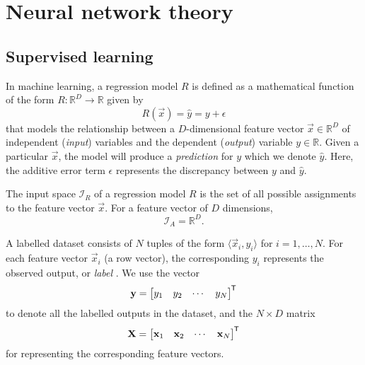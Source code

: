 \chapter{Neural network theory}
\section{Supervised learning}

\begin{definition}
    \label{def:reg_model}
    In machine learning, a regression model $R$ is defined as a mathematical function of the form $R:\mathbb{R}^D\rightarrow \mathbb{R}$ given by
    \begin{equation}
        \label{eq:reg_model}
        R(\vec{x}) = \hat{y} = y + \epsilon
    \end{equation}
    that models the relationship between a $D$-dimensional feature vector $\vec{x} \in \mathbb{R}^D$ of independent (\textit{input}) variables and the dependent (\textit{output}) variable $y \in \mathbb{R}$. 
    Given a particular $\vec{x}$, the model will produce a \textit{prediction} for $y$ which we denote $\hat{y}$.
    Here, the additive error term $\epsilon$ represents the discrepancy between $y$ and $\hat{y}$.
\end{definition}

\begin{definition}
    \label{def:input_space}
    The input space $\mathcal{I}_R$ of a regression model $R$ is the set of all possible assignments to the feature vector $\vec{x}$.
    For a feature vector of $D$ dimensions,
    \begin{equation}
        \mathcal{I}_A=\mathbb{R}^D.
    \end{equation}
\end{definition}

\begin{definition}
    \label{def:labelled_dataset}
    A labelled dataset consists of $N$ tuples of the form $\langle \vec{x}_i, y_i\rangle$ for $i=1,\dots,N$.
    For each feature vector $\vec{x}_i$ (a row vector), the corresponding $y_i$ represents the observed output, or \textit{label} \cite{burkov2019}.
    We use the vector
    \begin{equation}
        \label{eq:sup_learn_target}
        \mathbf{y} = \begin{bmatrix}
            y_1 & y_2 & \cdots & y_N
        \end{bmatrix}^{\mkern-1.5mu\mathsf{T}}
    \end{equation}
    to denote all the labelled outputs in the dataset, and the $N \times D$ matrix
    \begin{equation}
        \label{eq:sup_learn_input_matrix}
        \mathbf{X} = \begin{bmatrix}
            \mathbf{x}_1 & \mathbf{x}_2 & \cdots & \mathbf{x}_N
        \end{bmatrix}^{\mkern-1.5mu\mathsf{T}}
    \end{equation}
    for representing the corresponding feature vectors.
\end{definition}

